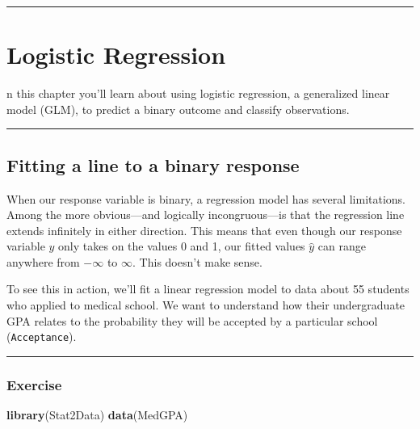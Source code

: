 \documentclass[]{book}
\newenvironment{Shaded}{\begin{snugshade}}{\end{snugshade}}
\newcommand{\KeywordTok}[1]{\textcolor[rgb]{0.13,0.29,0.53}{\textbf{#1}}}
\newcommand{\NormalTok}[1]{#1}
\begin{document}
\begin{center}\rule{0.5\linewidth}{\linethickness}\end{center}

\chapter{Logistic Regression}\label{logistic-regression}

n this chapter you'll learn about using logistic regression, a
generalized linear model (GLM), to predict a binary outcome and classify
observations.

\begin{center}\rule{0.5\linewidth}{\linethickness}\end{center}

\section{Fitting a line to a binary
response}\label{fitting-a-line-to-a-binary-response}

When our response variable is binary, a regression model has several
limitations. Among the more obvious---and logically incongruous---is
that the regression line extends infinitely in either direction. This
means that even though our response variable \(y\) only takes on the
values 0 and 1, our fitted values \(\hat{y}\) can range anywhere from
\(-\infty\) to \(\infty\). This doesn't make sense.

To see this in action, we'll fit a linear regression model to data about
55 students who applied to medical school. We want to understand how
their undergraduate GPA relates to the probability they will be accepted
by a particular school (\texttt{Acceptance}).

\begin{center}\rule{0.5\linewidth}{\linethickness}\end{center}

\subsection*{Exercise}\label{exercise-12}

\begin{Shaded}
\begin{Highlighting}[]
\KeywordTok{library}\NormalTok{(Stat2Data)}
\KeywordTok{data}\NormalTok{(MedGPA)}
\end{Highlighting}
\end{Shaded}
\end{document}
